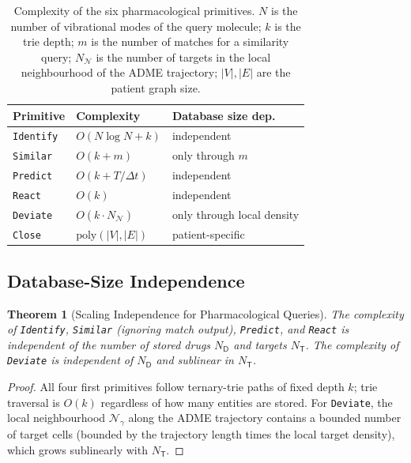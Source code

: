 \documentclass[11pt,twocolumn,a4paper]{article}
\newtheorem{theorem}{Theorem}[section]
\theoremstyle{definition}
\theoremstyle{remark}
\newcommand{\Drug}{\mathsf{D}}
\newcommand{\Target}{\mathsf{T}}
\begin{document}
\begin{table}[H]
\centering
\small
\begin{tabular}{lll}
\toprule
\textbf{Primitive} & \textbf{Complexity} & \textbf{Database size dep.} \\
\midrule
\texttt{Identify} & $O(N \log N + k)$ & independent \\
\texttt{Similar} & $O(k + m)$ & only through $m$ \\
\texttt{Predict} & $O(k + T/\Delta t)$ & independent \\
\texttt{React} & $O(k)$ & independent \\
\texttt{Deviate} & $O(k \cdot N_{\mathcal{N}})$ & only through local density \\
\texttt{Close} & $\mathrm{poly}(|V|, |E|)$ & patient-specific \\
\bottomrule
\end{tabular}
\caption{Complexity of the six pharmacological primitives. $N$ is the number of vibrational modes of the query molecule; $k$ is the trie depth; $m$ is the number of matches for a similarity query; $N_\mathcal{N}$ is the number of targets in the local neighbourhood of the ADME trajectory; $|V|, |E|$ are the patient graph size.}
\label{tab:complexity}
\end{table}

\subsection{Database-Size Independence}

\begin{theorem}[Scaling Independence for Pharmacological Queries]
\label{thm:scaling_indep}
The complexity of \texttt{Identify}, \texttt{Similar} (ignoring match output), \texttt{Predict}, and \texttt{React} is independent of the number of stored drugs $N_\Drug$ and targets $N_\Target$. The complexity of \texttt{Deviate} is independent of $N_\Drug$ and sublinear in $N_\Target$.
\end{theorem}

\begin{proof}
All four first primitives follow ternary-trie paths of fixed depth $k$; trie traversal is $O(k)$ regardless of how many entities are stored. For \texttt{Deviate}, the local neighbourhood $\mathcal{N}_\gamma$ along the ADME trajectory contains a bounded number of target cells (bounded by the trajectory length times the local target density), which grows sublinearly with $N_\Target$.
\end{proof}
\end{document}
